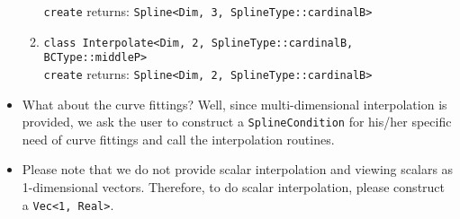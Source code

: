 \documentclass[12pt]{article}
\begin{document}
\begin{itemize}
\begin{enumerate}
                        \texttt{create} returns: \texttt{Spline<Dim, 3, SplineType::cardinalB>}
                  \item \texttt{class Interpolate<Dim, 2, SplineType::cardinalB, BCType::middleP>}\\
                        \texttt{create} returns: \texttt{Spline<Dim, 2, SplineType::cardinalB>}
              \end{enumerate}
        \item What about the curve fittings? Well, since multi-dimensional interpolation is provided, 
              we ask the user to construct a \texttt{SplineCondition} for his/her specific need
              of curve fittings and call the interpolation routines.
        \item Please note that we do not provide scalar interpolation and viewing scalars as
              1-dimensional vectors. Therefore, to do scalar interpolation, please construct a \texttt{Vec<1, Real>}.

    \end{itemize}
\end{document}
